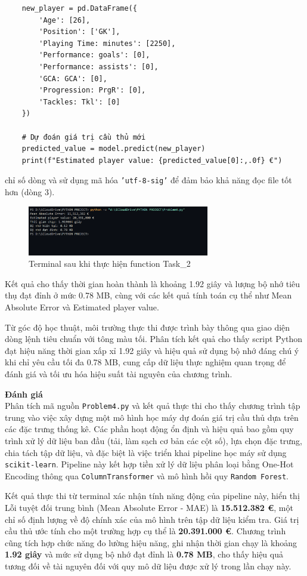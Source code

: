 \documentclass[12pt]{report}
\begin{document}
{\begin{lstlisting}
    new_player = pd.DataFrame({
        'Age': [26],
        'Position': ['GK'],
        'Playing Time: minutes': [2250],
        'Performance: goals': [0],
        'Performance: assists': [0],
        'GCA: GCA': [0],
        'Progression: PrgR': [0],
        'Tackles: Tkl': [0]
    })

    # Dự đoán giá trị cầu thủ mới
    predicted_value = model.predict(new_player)
    print(f"Estimated player value: {predicted_value[0]:,.0f} €")
\end{lstlisting}
chỉ số dòng và sử dụng mã hóa \texttt{'utf-8-sig'} để đảm bảo khả năng đọc file tốt hơn (dòng 3).

\begin{figure}[h]
    \centering
    \includegraphics[width=300px]{Terminal_41.png}
    \caption{Terminal sau khi thực hiện function Task\_2}
    \label{fig:res4}
\end{figure}
Kết quả cho thấy thời gian hoàn thành là khoảng 1.92 giây và lượng bộ nhớ tiêu thụ đạt đỉnh ở mức 0.78 MB, cùng với các kết quả tính toán cụ thể như Mean Absolute Error và Estimated player value.

Từ góc độ học thuật, môi trường thực thi được trình bày thông qua giao diện dòng lệnh tiêu chuẩn với tông màu tối. Phân tích kết quả cho thấy script Python đạt hiệu năng thời gian xấp xỉ 1.92 giây và hiệu quả sử dụng bộ nhớ đáng chú ý khi chỉ yêu cầu tối đa 0.78 MB, cung cấp dữ liệu thực nghiệm quan trọng để đánh giá và tối ưu hóa hiệu suất tài nguyên của chương trình.

\textbf{Đánh giá}\\
Phân tích mã nguồn \texttt{Problem4.py} và kết quả thực thi cho thấy chương trình tập trung vào việc xây dựng một mô hình học máy dự đoán giá trị cầu thủ dựa trên các đặc trưng thống kê. Các phần hoạt động ổn định và hiệu quả bao gồm quy trình xử lý dữ liệu ban đầu (tải, làm sạch cơ bản các cột số), lựa chọn đặc trưng, chia tách tập dữ liệu, và đặc biệt là việc triển khai pipeline học máy sử dụng \texttt{scikit-learn}. Pipeline này kết hợp tiền xử lý dữ liệu phân loại bằng One-Hot Encoding thông qua \texttt{ColumnTransformer} và mô hình hồi quy \texttt{Random Forest}. 

Kết quả thực thi từ terminal xác nhận tính năng động của pipeline này, hiển thị Lỗi tuyệt đối trung bình (Mean Absolute Error - MAE) là \textbf{15.512.382 €}, một chỉ số định lượng về độ chính xác của mô hình trên tập dữ liệu kiểm tra. Giá trị cầu thủ ước tính cho một trường hợp cụ thể là \textbf{20.391.000 €}. Chương trình cũng tích hợp chức năng đo lường hiệu năng, ghi nhận thời gian chạy là khoảng \textbf{1.92 giây} và mức sử dụng bộ nhớ đạt đỉnh là \textbf{0.78 MB}, cho thấy hiệu quả tương đối về tài nguyên đối với quy mô dữ liệu được xử lý trong lần chạy này.

}
\end{document}
